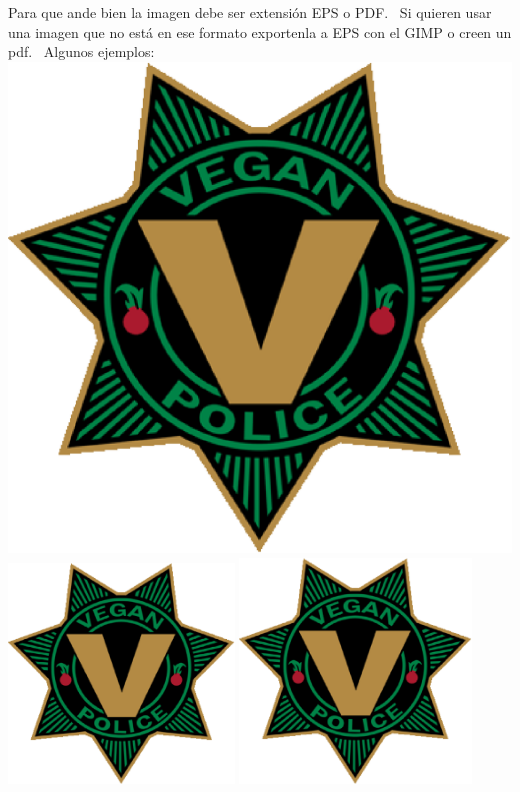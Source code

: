 \documentclass[a4paper,oneside,10pt]{article}
\begin{document}
Para que ande bien la imagen debe ser extensión EPS o PDF. \
Si quieren usar una imagen que no está en ese formato exportenla a EPS con el GIMP o creen un pdf. \
Algunos ejemplos: \\

\includegraphics{images/vegan_police.eps}
\includegraphics[width=60mm]{images/vegan_police.eps}
\includegraphics[height=60mm]{images/vegan_police.eps}
\end{document}
